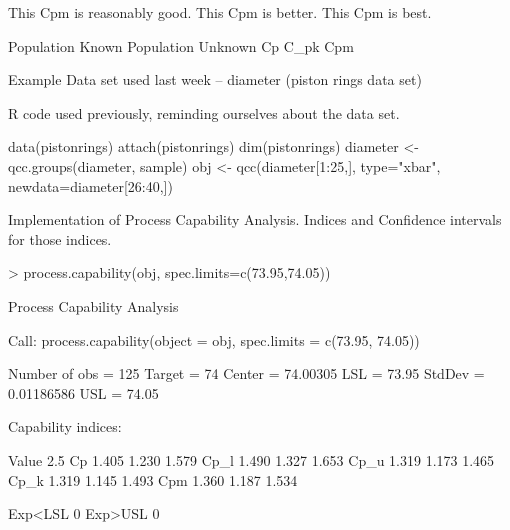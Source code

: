  	This Cpm is reasonably good.
 	This Cpm is better.
 	This Cpm is best.


Population Known	Population Unknown
Cp	 	 
C_{pk}	 	 
Cpm	 	 

 

Example
Data set used last week – diameter (piston rings data set)

R code used previously, reminding ourselves about the data set.

data(pistonrings)
attach(pistonrings)
dim(pistonrings)
diameter <- qcc.groups(diameter, sample)
obj <- qcc(diameter[1:25,], type="xbar", newdata=diameter[26:40,])
 
 


Implementation of Process Capability Analysis.
Indices and Confidence intervals for those indices.


> process.capability(obj, spec.limits=c(73.95,74.05))

Process Capability Analysis

Call:
process.capability(object = obj, spec.limits = c(73.95, 74.05))

Number of obs = 125          Target = 74      
       Center = 74.00305        LSL = 73.95   
       StdDev = 0.01186586      USL = 74.05   

Capability indices:

      Value   2.5%
Cp    1.405  1.230  1.579
Cp_l  1.490  1.327  1.653
Cp_u  1.319  1.173  1.465
Cp_k  1.319  1.145  1.493
Cpm   1.360  1.187  1.534

Exp<LSL 0%
Exp>USL 0%


 

